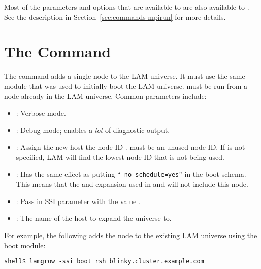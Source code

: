 Most of the parameters and options that are available to 
are also available to .  See the  description
in Section~\ref{sec:commands-mpirun} for more details.


\section{The  Command}
\label{sec:commands-lamgrow}

The  command adds a single node to the LAM universe.  It
must use the same  module that was used to initially boot
the LAM universe.   must be run from a node already in
the LAM universe.  Common parameters include:

\begin{itemize}
\item {}: Verbose mode.
  
\item {}: Debug mode; enables a {\em lot} of diagnostic
  output.

\item {}: Assign the new host the node ID
  .    must be an unused node ID.  If
   is not specified, LAM will find the lowest node ID that
  is not being used.
  
\item {}: Has the same effect as putting ``{\tt
    no\_\-schedule=yes}'' in the boot schema.  This means that the
   and  expansion used in  and 
  will not include this node.

\item {}: Pass in SSI parameter
   with the value .

\item {}: The name of the host to expand the
  universe to.
\end{itemize}

For example, the following adds the node  to the existing
LAM universe using the  boot module:

\lstset{style=lam-cmdline}
\begin{lstlisting}
shell$ lamgrow -ssi boot rsh blinky.cluster.example.com
\end{lstlisting}

